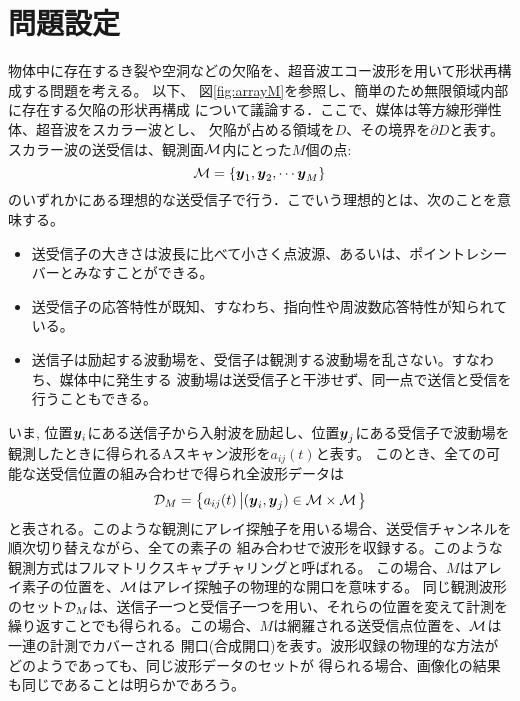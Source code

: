 \documentclass[10pt,a4j,dvipdfmx]{jarticle}
\begin{document}
\section{問題設定}
物体中に存在するき裂や空洞などの欠陥を、超音波エコー波形を用いて形状再構成する問題を考える。
以下、 図\ref{fig:arrayM}を参照し、簡単のため無限領域内部に存在する欠陥の形状再構成
について議論する．ここで、媒体は等方線形弾性体、超音波をスカラー波とし、
欠陥が占める領域を$D$、その境界を$\partial D$と表す。
スカラー波の送受信は、観測面$\cal M$内にとった$M$個の点:
\begin{equation}
	{\cal M} =\left\{ 
		\mbox{\boldmath $y$}_1, \mbox{\boldmath $y$}_2, \cdots \mbox{\boldmath $y$}_M
	\right\}
	\label{eqn:}
\end{equation}
のいずれかにある理想的な送受信子で行う．こでいう理想的とは、次のことを意味する。
\begin{itemize}
\item
送受信子の大きさは波長に比べて小さく点波源、あるいは、ポイントレシーバーとみなすことができる。
\item
送受信子の応答特性が既知、すなわち、指向性や周波数応答特性が知られている。
\item
送信子は励起する波動場を、受信子は観測する波動場を乱さない。すなわち、媒体中に発生する
波動場は送受信子と干渉せず、同一点で送信と受信を行うこともできる。
\end{itemize}
いま, 位置$\mbox{\boldmath $y$}_i$にある送信子から入射波を励起し、位置$\mbox{\boldmath $y$}_j$にある受信子で波動場を
観測したときに得られるAスキャン波形を$a_{ij}(t)$と表す。
このとき、全ての可能な送受信位置の組み合わせで得られ全波形データは
\begin{equation}
	{\cal D}_M= \left\{ a_{ij}(t) \left| (\mbox{\boldmath $y$}_i,\mbox{\boldmath $y$}_j)  \in {\cal M}\times {\cal M} \right.\right\}
	\label{eqn:full_mat}
\end{equation}
と表される。このような観測にアレイ探触子を用いる場合、送受信チャンネルを順次切り替えながら、全ての素子の
組み合わせで波形を収録する。このような観測方式はフルマトリクスキャプチャリングと呼ばれる。
この場合、$M$はアレイ素子の位置を、$\cal M$はアレイ探触子の物理的な開口を意味する。
同じ観測波形のセット${\cal D}_M$は、送信子一つと受信子一つを用い、それらの位置を変えて計測を
繰り返すことでも得られる。この場合、$M$は網羅される送受信点位置を、$\cal M$は一連の計測でカバーされる
開口(合成開口)を表す。波形収録の物理的な方法がどのようであっても、同じ波形データのセットが
得られる場合、画像化の結果も同じであることは明らかであろう。
\end{document}
